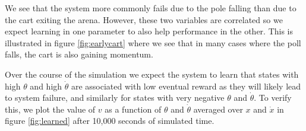 \documentclass{article}
\begin{document}
We see that the system more commonly fails due to the pole falling than due to the cart exiting the arena. However, these two variables are correlated so we expect learning in one parameter to also help performance in the other.
This is illustrated in figure \ref{fig:earlycart} where we see that in many cases where the poll falls, the cart is also gaining momentum.

Over the course of the simulation we expect the system to learn that states with high $\theta$ and high $\dot \theta$ are associated with low eventual reward as they will likely lead to system failure, and similarly for states with very negative $\theta$ and $\dot \theta$. To verify this, we plot the value of $v$ as a function of $\theta$ and $\dot \theta$ averaged over $x$ and $\dot x$ in figure \ref{fig:learned} after 10,000 seconds of simulated time.
\end{document}

